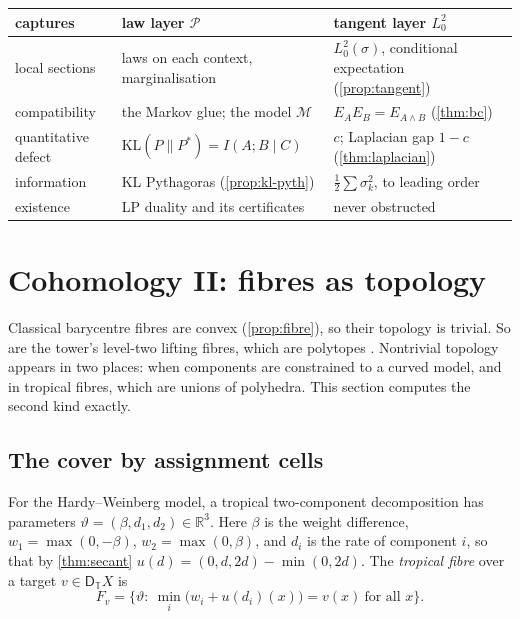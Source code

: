 \documentclass[11pt]{article}
\theoremstyle{definition}
\newcommand{\DT}{\mathsf D_{\mathbb T}}
\newcommand{\R}{\mathbb R}
\newcommand{\KL}{\mathrm{KL}}
\begin{document}
\begin{center}\small
\begin{tabular}{>{\raggedright}p{3.4cm}>{\raggedright}p{5.2cm}>{\raggedright\arraybackslash}p{5.2cm}}\toprule
captures & law layer $\mathcal P$ & tangent layer $L^2_0$ \\\midrule
local sections & laws on each context, marginalisation & $L^2_0(\sigma)$, conditional expectation (\cref{prop:tangent})\\
compatibility & the Markov glue; the model $\mathcal M$ & $E_AE_B=E_{A\wedge B}$ (\cref{thm:bc})\\
quantitative defect & $\KL(P\|P^*)=I(A;B\mid C)$ & $c$; Laplacian gap $1-c$ (\cref{thm:laplacian})\\
information & KL Pythagoras (\cref{prop:kl-pyth}) & $\tfrac12\sum\sigma_k^2$, to leading order\\
existence & LP duality and its certificates & never obstructed\\\bottomrule
\end{tabular}
\end{center}

\FloatBarrier
\section{Cohomology II: fibres as topology}\label{sec:fibre-topology}
Classical barycentre fibres are convex (\cref{prop:fibre}), so their topology is trivial. So are the tower's level-two lifting fibres,
which are polytopes \cite[Def.~10.14]{Tower}. Nontrivial topology appears in two places: when components are constrained to a curved
model, and in tropical fibres, which are unions of polyhedra. This section computes the second kind exactly.

\subsection{The cover by assignment cells}
For the Hardy--Weinberg model, a tropical two-component decomposition has parameters $\vartheta=(\beta,d_1,d_2)\in\R^3$. Here $\beta$ is
the weight difference, $w_1=\max(0,-\beta)$, $w_2=\max(0,\beta)$, and $d_i$ is the rate of component $i$, so that by \cref{thm:secant}
$u(d)=(0,d,2d)-\min(0,2d)$. The \emph{tropical fibre} over a target $v\in\DT X$ is
\[
F_v=\big\{\vartheta:\ \min_i\big(w_i+u(d_i)(x)\big)=v(x)\ \text{for all }x\big\}.
\]
\end{document}

